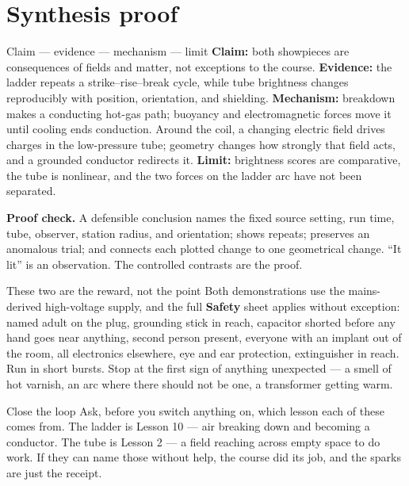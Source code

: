\section{Synthesis proof}
\begin{telospanel}{Claim --- evidence --- mechanism --- limit}
\textbf{Claim:} both showpieces are consequences of fields and matter, not
exceptions to the course. \textbf{Evidence:} the ladder repeats a strike--rise--break
cycle, while tube brightness changes reproducibly with position, orientation,
and shielding. \textbf{Mechanism:} breakdown makes a conducting hot-gas path;
buoyancy and electromagnetic forces move it until cooling ends conduction.
Around the coil, a changing electric field drives charges in the low-pressure
tube; geometry changes how strongly that field acts, and a grounded conductor
redirects it. \textbf{Limit:} brightness scores are comparative, the tube is
nonlinear, and the two forces on the ladder arc have not been separated.
\end{telospanel}

\begin{telosframe}
\textbf{Proof check.}
A defensible conclusion names the fixed source setting, run time, tube, observer,
station radius, and orientation; shows repeats; preserves an anomalous trial;
and connects each plotted change to one geometrical change. ``It lit'' is an
observation. The controlled contrasts are the proof.
\end{telosframe}

\begin{teloshazard}{These two are the reward, not the point}
Both demonstrations use the mains-derived high-voltage supply, and the full
\textbf{Safety} sheet applies without exception: named adult on the plug,
grounding stick in reach, capacitor shorted before any hand goes near anything,
second person present, everyone with an implant out of the room, all electronics
elsewhere, eye and ear protection, extinguisher in reach. Run in short bursts.
Stop at the first sign of anything unexpected --- a smell of hot varnish, an arc
where there should not be one, a transformer getting warm.
\end{teloshazard}

\begin{telospanel}{Close the loop}
Ask, before you switch anything on, which lesson each of these comes from. The
ladder is Lesson 10 --- air breaking down and becoming a conductor. The tube is
Lesson 2 --- a field reaching across empty space to do work. If they can name
those without help, the course did its job, and the sparks are just the receipt.
\end{telospanel}

